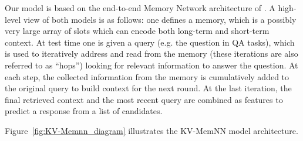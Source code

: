 Our model is based on
 the end-to-end Memory Network  architecture of \cite{sukhbaatar2015end}.
A high-level view of both models is as follows:
one defines a memory, which is a possibly very large array of slots
 which can encode both long-term
and short-term context.
At test time one is given a query (e.g. the question in QA tasks), which is used to iteratively address and read from the memory (these iterations are also referred to as ``hops'') looking for relevant information to answer the question. At each step, the collected information from the memory is cumulatively added to the original query to build context for the next round. At the last iteration, the final retrieved context and the most recent query are combined as features to predict a response from a list of candidates.

%
Figure~\ref{fig:KV-Memnn_diagram} illustrates the KV-MemNN model architecture.

